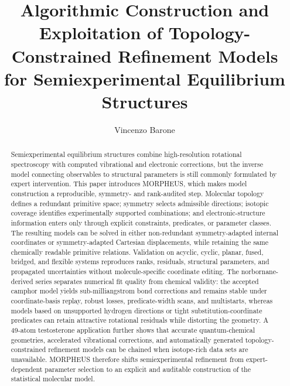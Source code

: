 \documentclass[aip,jcp,reprint,longbibliography,floatfix]{revtex4-2}
\begin{document}
\title{Algorithmic Construction and Exploitation of Topology-Constrained Refinement Models for Semiexperimental Equilibrium Structures}

\author{Vincenzo Barone}

\begin{abstract}
Semiexperimental equilibrium structures combine high-resolution rotational spectroscopy with computed vibrational and electronic corrections, but the inverse model connecting observables to structural parameters is still commonly formulated by expert intervention. This paper introduces MORPHEUS, which makes model construction a reproducible, symmetry- and rank-audited step. Molecular topology defines a redundant primitive space; symmetry selects admissible directions; isotopic coverage identifies experimentally supported combinations; and electronic-structure information enters only through explicit constraints, predicates, or parameter classes. The resulting models can be solved in either non-redundant symmetry-adapted internal coordinates or symmetry-adapted Cartesian displacements, while retaining the same chemically readable primitive relations. Validation on acyclic, cyclic, planar, fused, bridged, and flexible systems reproduces ranks, residuals, structural parameters, and propagated uncertainties without molecule-specific coordinate editing. The norbornane-derived series separates numerical fit quality from chemical validity: the accepted camphor model yields sub-milliangstrom bond corrections and remains stable under coordinate-basis replay, robust losses, predicate-width scans, and multistarts, whereas models based on unsupported hydrogen directions or tight substitution-coordinate predicates can retain attractive rotational residuals while distorting the geometry. A 49-atom testosterone application further shows that accurate quantum-chemical geometries, accelerated vibrational corrections, and automatically generated topology-constrained refinement models can be chained when isotope-rich data sets are unavailable. MORPHEUS therefore shifts semiexperimental refinement from expert-dependent parameter selection to an explicit and auditable construction of the statistical molecular model.
\end{abstract}

\end{document}

